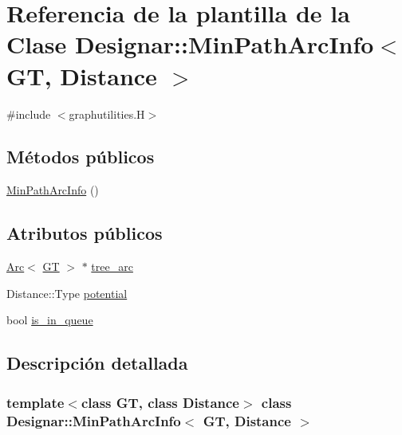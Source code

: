 \hypertarget{class_designar_1_1_min_path_arc_info}{}\section{Referencia de la plantilla de la Clase Designar\+:\+:Min\+Path\+Arc\+Info$<$ GT, Distance $>$}
\label{class_designar_1_1_min_path_arc_info}


{\ttfamily \#include $<$graphutilities.\+H$>$}

\subsection*{Métodos públicos}
\begin{DoxyCompactItemize}
\item 
\hyperlink{class_designar_1_1_min_path_arc_info_a243f02fd41ed0786f6f2d907843d0598}{Min\+Path\+Arc\+Info} ()
\end{DoxyCompactItemize}
\subsection*{Atributos públicos}
\begin{DoxyCompactItemize}
\item 
\hyperlink{namespace_designar_a3f55fb5513d62ff47cbc8f72b8e95d6f}{Arc}$<$ \hyperlink{demo-buildgraph_8_c_a3001c40d2c31ca87ed96cd7d1334a55e}{GT} $>$ $\ast$ \hyperlink{class_designar_1_1_min_path_arc_info_a2f5c165e547c75ec582dd3724a93137c}{tree\+\_\+arc}
\item 
Distance\+::\+Type \hyperlink{class_designar_1_1_min_path_arc_info_ae53cddd12f7488ab3daf3711963b533d}{potential}
\item 
bool \hyperlink{class_designar_1_1_min_path_arc_info_a97d17f60e2e02381708f68b79c6bf82d}{is\+\_\+in\+\_\+queue}
\end{DoxyCompactItemize}


\subsection{Descripción detallada}
\subsubsection*{template$<$class GT, class Distance$>$\newline
class Designar\+::\+Min\+Path\+Arc\+Info$<$ G\+T, Distance $>$}



